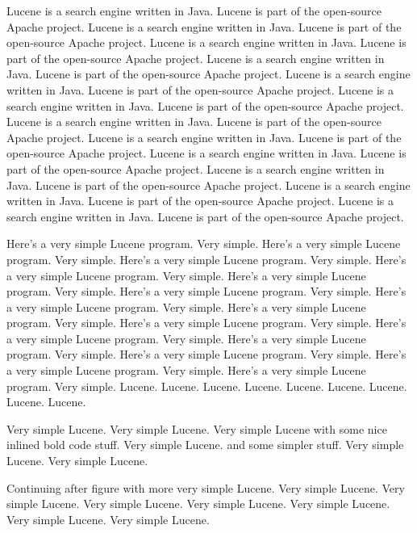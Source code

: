 Lucene is a search engine written in Java.  Lucene is part of the
open-source Apache project.
Lucene is a search engine written in Java.  Lucene is part of the
open-source Apache project.
Lucene is a search engine written in Java.  Lucene is part of the
open-source Apache project.
Lucene is a search engine written in Java.  Lucene is part of the
open-source Apache project.
Lucene is a search engine written in Java.  Lucene is part of the
open-source Apache project.
Lucene is a search engine written in Java.  Lucene is part of the
open-source Apache project.
Lucene is a search engine written in Java.  Lucene is part of the
open-source Apache project.
Lucene is a search engine written in Java.  Lucene is part of the
open-source Apache project.
Lucene is a search engine written in Java.  Lucene is part of the
open-source Apache project.
Lucene is a search engine written in Java.  Lucene is part of the
open-source Apache project.
Lucene is a search engine written in Java.  Lucene is part of the
open-source Apache project.
Lucene is a search engine written in Java.  Lucene is part of the
open-source Apache project.
%


\noindent
Here's a very simple Lucene program.  Very simple.
Here's a very simple Lucene program.  Very simple.
Here's a very simple Lucene program.  Very simple.
Here's a very simple Lucene program.  Very simple.
Here's a very simple Lucene program.  Very simple.
Here's a very simple Lucene program.  Very simple.
Here's a very simple Lucene program.  Very simple.
Here's a very simple Lucene program.  Very simple.
Here's a very simple Lucene program.  Very simple.
Here's a very simple Lucene program.  Very simple.
Here's a very simple Lucene program.  Very simple.
Here's a very simple Lucene program.  Very simple.
Here's a very simple Lucene program.  Very simple.
Here's a very simple Lucene program.  Very simple.
Lucene.
Lucene.
Lucene.
Lucene.
Lucene.
Lucene.
Lucene.
Lucene.
Lucene.

Very simple Lucene.
Very simple Lucene.
Very simple Lucene with some nice inlined
bold code
 stuff.
Very simple Lucene.
and some simpler  stuff.
Very simple Lucene.
Very simple Lucene.

%

\noindent
Continuing after figure with more very simple Lucene.
Very simple Lucene.
Very simple Lucene.
Very simple Lucene.
Very simple Lucene.
Very simple Lucene.
Very simple Lucene.
Very simple Lucene.

